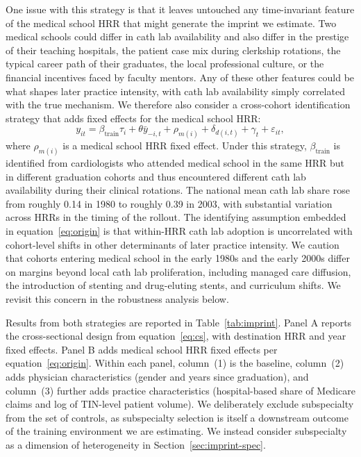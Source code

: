 \documentclass[12pt]{article}
\begin{document}
One issue with this strategy is that it leaves untouched any time-invariant feature of the medical school HRR that might generate the imprint we estimate. Two medical schools could differ in cath lab availability and also differ in the prestige of their teaching hospitals, the patient case mix during clerkship rotations, the typical career path of their graduates, the local professional culture, or the financial incentives faced by faculty mentors. Any of these other features could be what shapes later practice intensity, with cath lab availability simply correlated with the true mechanism. We therefore also consider a cross-cohort identification strategy that adds fixed effects for the medical school HRR:
\begin{equation}\label{eq:origin}
y_{it} = \beta_{\text{train}} \tau_{i} + \theta \bar{y}_{-i,t} + \rho_{m(i)} + \delta_{d(i,t)} + \gamma_{t} + \varepsilon_{it},
\end{equation}
where $\rho_{m(i)}$ is a medical school HRR fixed effect. Under this strategy, $\beta_{\text{train}}$ is identified from cardiologists who attended medical school in the same HRR but in different graduation cohorts and thus encountered different cath lab availability during their clinical rotations. The national mean cath lab share rose from roughly 0.14 in 1980 to roughly 0.39 in 2003, with substantial variation across HRRs in the timing of the rollout. The identifying assumption embedded in equation~\eqref{eq:origin} is that within-HRR cath lab adoption is uncorrelated with cohort-level shifts in other determinants of later practice intensity. We caution that cohorts entering medical school in the early 1980s and the early 2000s differ on margins beyond local cath lab proliferation, including managed care diffusion, the introduction of stenting and drug-eluting stents, and curriculum shifts. We revisit this concern in the robustness analysis below.

Results from both strategies are reported in Table~\ref{tab:imprint}. Panel A reports the cross-sectional design from equation~\eqref{eq:cs}, with destination HRR and year fixed effects. Panel B adds medical school HRR fixed effects per equation~\eqref{eq:origin}. Within each panel, column~(1) is the baseline, column~(2) adds physician characteristics (gender and years since graduation), and column~(3) further adds practice characteristics (hospital-based share of Medicare claims and log of TIN-level patient volume). We deliberately exclude subspecialty from the set of controls, as subspecialty selection is itself a downstream outcome of the training environment we are estimating. We instead consider subspecialty as a dimension of heterogeneity in Section~\ref{sec:imprint-spec}.
\end{document}
